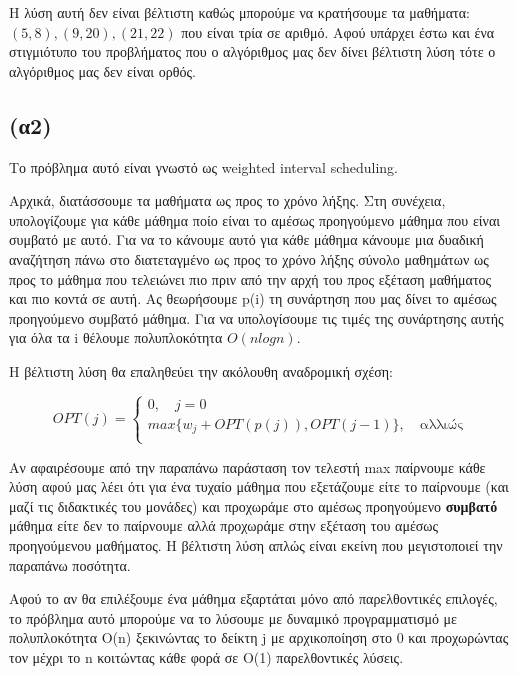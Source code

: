 \documentclass[a4paper,oneside, 11pt]{article}
\begin{document}
\begin{enumerate}
	Η λύση αυτή δεν είναι βέλτιστη καθώς μπορούμε να κρατήσουμε τα μαθήματα: $(5,8), (9,20), (21,22)$ που είναι τρία σε αριθμό. Αφού υπάρχει έστω και ένα στιγμιότυπο του προβλήματος που ο αλγόριθμος μας δεν δίνει βέλτιστη λύση τότε ο αλγόριθμος μας δεν είναι ορθός.
\end{enumerate}

\subsection*{(α2)}

Το πρόβλημα αυτό είναι γνωστό ως weighted interval scheduling. \bigbreak 

Αρχικά, διατάσσουμε τα μαθήματα ως προς το χρόνο λήξης. Στη συνέχεια, υπολογίζουμε για κάθε μάθημα ποίο είναι το αμέσως προηγούμενο μάθημα που είναι συμβατό με αυτό. Για να το κάνουμε αυτό για κάθε μάθημα κάνουμε μια δυαδική αναζήτηση πάνω στο διατεταγμένο ως προς το χρόνο λήξης σύνολο μαθημάτων ως προς το μάθημα που τελειώνει πιο πριν από την αρχή του προς εξέταση μαθήματος και πιο κοντά σε αυτή. Ας θεωρήσουμε p(i) τη συνάρτηση που μας δίνει το αμέσως προηγούμενο συμβατό μάθημα. Για να υπολογίσουμε τις τιμές της συνάρτησης αυτής για όλα τα i θέλουμε πολυπλοκότητα $O(nlogn)$.

Η βέλτιστη λύση θα επαληθεύει την ακόλουθη αναδρομική σχέση:

\[ OPT(j) = \left\{
\begin{array}{ll}
0, \quad j=0\\
max \{ w_j + OPT\left(p(j)\right), OPT(j-1)\}, \quad \textrm{αλλιώς}\\
\end{array} 
\right. \]

Αν αφαιρέσουμε από την παραπάνω παράσταση τον τελεστή max παίρνουμε κάθε λύση αφού μας λέει ότι για ένα τυχαίο μάθημα που εξετάζουμε είτε το παίρνουμε (και μαζί τις διδακτικές του μονάδες) και προχωράμε στο αμέσως προηγούμενο \textbf{συμβατό} μάθημα είτε δεν το παίρνουμε αλλά προχωράμε στην εξέταση του αμέσως προηγούμενου μαθήματος. Η βέλτιστη λύση απλώς είναι εκείνη που μεγιστοποιεί την παραπάνω ποσότητα. \bigbreak 


Αφού το αν θα επιλέξουμε ένα μάθημα εξαρτάται μόνο από παρελθοντικές επιλογές, το πρόβλημα αυτό μπορούμε να το λύσουμε με δυναμικό προγραμματισμό με πολυπλοκότητα O(n) ξεκινώντας το δείκτη j με αρχικοποίηση στο 0 και προχωρώντας τον μέχρι το n κοιτώντας κάθε φορά σε O(1) παρελθοντικές λύσεις. \bigbreak 
\end{document}
